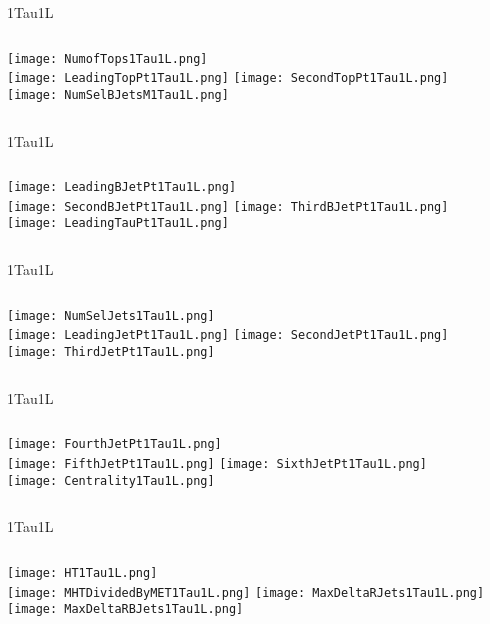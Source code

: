 \documentclass{beamer}
\begin{document}
\begin{frame}{1Tau1L}
    \begin{columns}[t]
    \centering
    \texttt{[image: NumofTops1Tau1L.png]}\\
    \texttt{[image: LeadingTopPt1Tau1L.png]}
    \centering
    \texttt{[image: SecondTopPt1Tau1L.png]}\\
    \texttt{[image: NumSelBJetsM1Tau1L.png]}
    \end{columns}
\end{frame}
\begin{frame}{1Tau1L}
    \begin{columns}[t]
    \centering
    \texttt{[image: LeadingBJetPt1Tau1L.png]}\\
    \texttt{[image: SecondBJetPt1Tau1L.png]}
    \centering
    \texttt{[image: ThirdBJetPt1Tau1L.png]}\\
    \texttt{[image: LeadingTauPt1Tau1L.png]}
    \end{columns}
\end{frame}
\begin{frame}{1Tau1L}
    \begin{columns}[t]
    \centering
    \texttt{[image: NumSelJets1Tau1L.png]}\\
    \texttt{[image: LeadingJetPt1Tau1L.png]}
    \centering
    \texttt{[image: SecondJetPt1Tau1L.png]}\\
    \texttt{[image: ThirdJetPt1Tau1L.png]}
    \end{columns}
\end{frame}
\begin{frame}{1Tau1L}
    \begin{columns}[t]
    \centering
    \texttt{[image: FourthJetPt1Tau1L.png]}\\
    \texttt{[image: FifthJetPt1Tau1L.png]}
    \centering
    \texttt{[image: SixthJetPt1Tau1L.png]}\\
    \texttt{[image: Centrality1Tau1L.png]}
    \end{columns}
\end{frame}
\begin{frame}{1Tau1L}
    \begin{columns}[t]
    \centering
    \texttt{[image: HT1Tau1L.png]}\\
    \texttt{[image: MHTDividedByMET1Tau1L.png]}
    \centering
    \texttt{[image: MaxDeltaRJets1Tau1L.png]}\\
    \texttt{[image: MaxDeltaRBJets1Tau1L.png]}
    \end{columns}
\end{frame}
\end{document}
